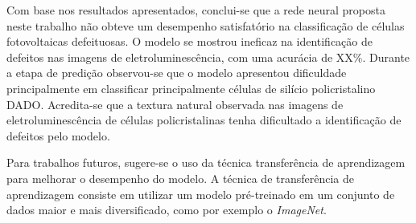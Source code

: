 \documentclass[conference]{IEEEtran}
\begin{document}
Com base nos resultados apresentados, conclui-se que a rede neural proposta
neste
trabalho não obteve um desempenho satisfatório na classificação de células
fotovoltaicas defeituosas. O modelo se mostrou ineficaz na identificação de
defeitos nas imagens de eletroluminescência, com uma acurácia de XX\%. Durante
a etapa de predição observou-se que o modelo apresentou dificuldade
principalmente em classificar principalmente células de silício policristalino
DADO. Acredita-se que a textura natural observada nas imagens de
eletroluminescência de células policristalinas tenha dificultado a
identificação de defeitos pelo modelo.

Para trabalhos futuros, sugere-se o uso da técnica transferência de
aprendizagem para melhorar o desempenho do modelo. A técnica de transferência
de aprendizagem consiste em utilizar um modelo pré-treinado em um conjunto de
dados maior e mais diversificado, como por exemplo o \textit{ImageNet}.



\end{document}
